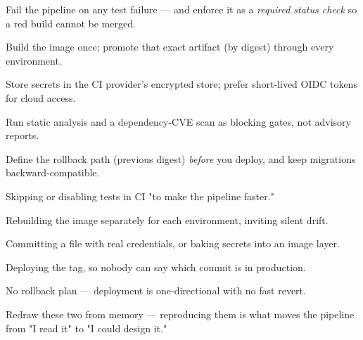 \begin{bestpractices}
\begin{wbitem}
  \item Fail the pipeline on any test failure --- and enforce it as a \emph{required status check} so a red build cannot be merged.
  \item Build the image once; promote that exact artifact (by digest) through every environment.
  \item Store secrets in the CI provider's encrypted store; prefer short-lived OIDC tokens for cloud access.
  \item Run static analysis and a dependency-CVE scan as blocking gates, not advisory reports.
  \item Define the rollback path (previous digest) \emph{before} you deploy, and keep migrations backward-compatible.
\end{wbitem}
\end{bestpractices}
\begin{mistakes}
\begin{wbitem}
  \item Skipping or disabling tests in CI "to make the pipeline faster."
  \item Rebuilding the image separately for each environment, inviting silent drift.
  \item Committing a  file with real credentials, or baking secrets into an image layer.
  \item Deploying the  tag, so nobody can say which commit is in production.
  \item No rollback plan --- deployment is one-directional with no fast revert.
\end{wbitem}
\end{mistakes}


Redraw these two from memory --- reproducing them is what moves the pipeline from "I read it" to "I could design it."

\begin{writespace}
\end{writespace}

\begin{writespace}
\end{writespace}

